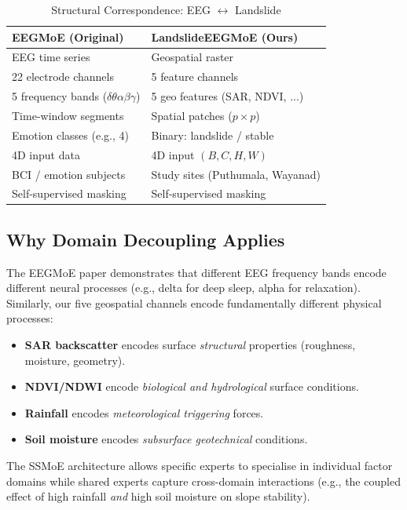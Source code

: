 \documentclass[conference]{IEEEtran}
\begin{document}
\begin{table}[h]
\centering
\caption{Structural Correspondence: EEG $\leftrightarrow$ Landslide}
\label{tab:correspondence}
\begin{tabular}{@{}ll@{}}
\toprule
\textbf{EEGMoE (Original)} & \textbf{LandslideEEGMoE (Ours)} \\
\midrule
EEG time series & Geospatial raster \\
22 electrode channels & 5 feature channels \\
5 frequency bands ($\delta\theta\alpha\beta\gamma$) & 5 geo features (SAR, NDVI, ...) \\
Time-window segments & Spatial patches ($p \times p$) \\
Emotion classes (e.g., 4) & Binary: landslide / stable \\
4D input data & 4D input $(B, C, H, W)$ \\
BCI / emotion subjects & Study sites (Puthumala, Wayanad) \\
Self-supervised masking & Self-supervised masking \\
\bottomrule
\end{tabular}
\end{table}

\subsection{Why Domain Decoupling Applies}

The EEGMoE paper demonstrates that different EEG frequency bands encode different neural processes (e.g., delta for deep sleep, alpha for relaxation). Similarly, our five geospatial channels encode fundamentally different physical processes:

\begin{itemize}
    \item \textbf{SAR backscatter} encodes surface \textit{structural} properties (roughness, moisture, geometry).
    \item \textbf{NDVI/NDWI} encode \textit{biological and hydrological} surface conditions.
    \item \textbf{Rainfall} encodes \textit{meteorological triggering} forces.
    \item \textbf{Soil moisture} encodes \textit{subsurface geotechnical} conditions.
\end{itemize}

The SSMoE architecture allows specific experts to specialise in individual factor domains while shared experts capture cross-domain interactions (e.g., the coupled effect of high rainfall \textit{and} high soil moisture on slope stability).
\end{document}
